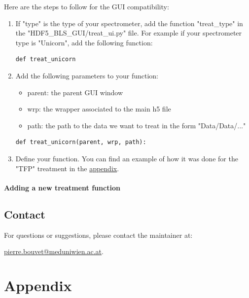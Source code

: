 \documentclass{book}
\begin{document}
            Here are the steps to follow for the GUI compatibility:
            \begin{enumerate}
                \item If "type" is the type of your spectrometer, add the function "treat\_type" in the "HDF5\_BLS\_GUI/treat\_ui.py" file. For example if your spectrometer type is "Unicorn", add the following function:
\begin{lstlisting}
def treat_unicorn
\end{lstlisting}
                \item Add the following parameters to your function:
                \begin{itemize}
                    \item parent: the parent GUI window
                    \item wrp: the wrapper associated to the main h5 file
                    \item path: the path to the data we want to treat in the form "Data/Data/..."
                \end{itemize}
\begin{lstlisting}
def treat_unicorn(parent, wrp, path):
\end{lstlisting}
                \item Define your function. You can find an example of how it was done for the "TFP" treatment in the \hyperref[subsec:example_treatment.TFP]{appendix}.
            \end{enumerate}
        
        \subsection{Adding a new treatment function} \label{subsec:treatment.new}

\chapter*{Contact}
    For questions or suggestions, please contact the maintainer at:

    \begin{center}
        \href{mailto:pierre.bouvet@meduniwien.ac.at}{pierre.bouvet@meduniwien.ac.at}.
    \end{center}




\appendix

\part*{Appendix}
\end{document}
